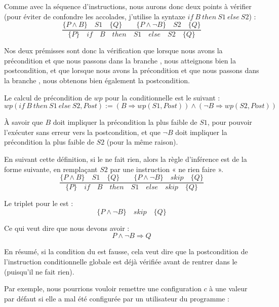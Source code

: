 Comme avec la séquence d'instructions, nous aurons donc deux points à vérifier
(pour éviter de confondre les accolades, j'utilise la syntaxe
$if\ B\ then\ S1\ else\ S2$) :
$$\dfrac{\{P \wedge B\}\quad S1\quad \{Q\} \quad \quad \{P \wedge \neg B\}\quad S2\quad \{Q\}}{\{P\}\quad if\quad B\quad then\quad S1\quad else\quad S2 \quad \{Q\}}$$



Nos deux prémisses sont donc la vérification que lorsque nous avons la
précondition et que nous passons dans la branche , nous atteignons bien la
postcondition, et que lorsque nous avons la précondition et que nous passons
dans la branche , nous obtenons bien également la postcondition.



Le calcul de précondition de $wp$ pour la conditionnelle est le suivant :
$$wp(if\ B\ then\ S1\ else\ S2 , Post) := (B \Rightarrow wp(S1, Post)) \wedge (\neg B \Rightarrow wp(S2, Post))$$


À savoir que $B$ doit impliquer la précondition la plus faible de $S1$, pour
pouvoir l'exécuter sans erreur vers la postcondition, et que $\neg B$ doit
impliquer la précondition la plus faible de $S2$ (pour la même raison).





En suivant cette définition, si le  ne fait rien, alors la règle
d'inférence est de la forme suivante, en remplaçant $S2$ par une instruction
« ne rien faire ».
$$\dfrac{\{P \wedge B\}\quad S1\quad \{Q\} \quad \quad \{P \wedge \neg B\}\quad skip\quad \{Q\}}{\{P\}\quad if\quad B\quad then\quad S1\quad else\quad skip \quad \{Q\}}$$



Le triplet pour le  est :
$$\{P \wedge \neg B\}\quad skip\quad \{Q\}$$



Ce qui veut dire que nous devons avoir :
$$P \wedge \neg B \Rightarrow Q$$



En résumé, si la condition du  est fausse, cela veut dire que la
postcondition de l'instruction conditionnelle globale est déjà vérifiée avant de
rentrer dans le  (puisqu'il ne fait rien).



Par exemple, nous pourrions vouloir remettre une configuration $c$ à une valeur
par défaut si elle a mal été configurée par un utilisateur du programme :



